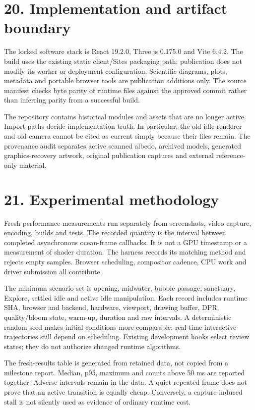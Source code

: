 \documentclass[
  english,
  11pt,
]{article}
\begin{document}
\section{20. Implementation and artifact
boundary}\label{implementation-and-artifact-boundary}

The locked software stack is React 19.2.0, Three.js 0.175.0 and Vite
6.4.2. The build uses the existing static client/Sites packaging path;
publication does not modify its worker or deployment configuration.
Scientific diagrams, plots, metadata and portable browser tools are
publication additions only. The source manifest checks byte parity of
runtime files against the approved commit rather than inferring parity
from a successful build.

The repository contains historical modules and assets that are no longer
active. Import paths decide implementation truth. In particular, the old
idle renderer and old camera cannot be cited as current simply because
their files remain. The provenance audit separates active scanned
albedo, archived models, generated graphics-recovery artwork, original
publication captures and external reference-only material.

\section{21. Experimental methodology}\label{experimental-methodology}

Fresh performance measurements run separately from screenshots, video
capture, encoding, builds and tests. The recorded quantity is the
interval between completed asynchronous ocean-frame callbacks. It is not
a GPU timestamp or a measurement of shader duration. The harness records
its matching method and rejects empty samples. Browser scheduling,
compositor cadence, CPU work and driver submission all contribute.

The minimum scenario set is opening, midwater, bubble passage,
sanctuary, Explore, settled idle and active idle manipulation. Each
record includes runtime SHA, browser and backend, hardware, viewport,
drawing buffer, DPR, quality/bloom state, warm-up, duration and raw
intervals. A deterministic random seed makes initial conditions more
comparable; real-time interactive trajectories still depend on
scheduling. Existing development hooks select review states; they do not
authorize changed runtime algorithms.

The fresh-results table is generated from retained data, not copied from
a milestone report. Median, p95, maximum and counts above 50 ms are
reported together. Adverse intervals remain in the data. A quiet
repeated frame does not prove that an active transition is equally
cheap. Conversely, a capture-induced stall is not silently used as
evidence of ordinary runtime cost.
\end{document}

